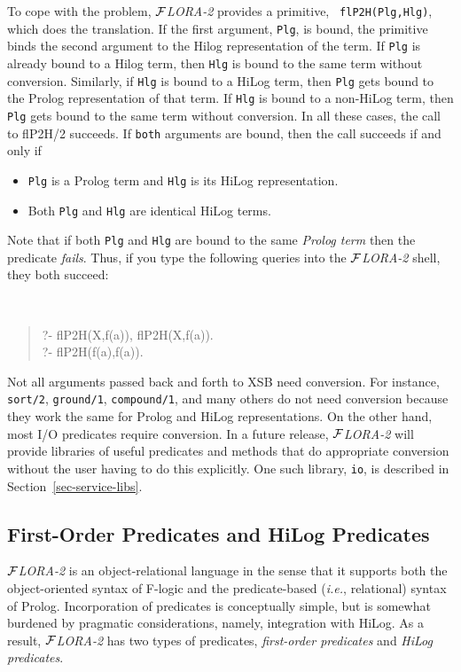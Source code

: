 \documentclass[11pt]{article}
\newcommand{\FLORA}{{\mbox{${\cal F}${\small\it LORA}\rm\emph{-2}}}\xspace}
\newcommand{\fl}{\mbox{F-logic}\xspace}
\begin{document}
To cope with the problem, \FLORA provides a primitive, {\tt
  flP2H(Plg,Hlg)}, which does the translation. If the first argument,
{\tt Plg}, is bound, the primitive binds the second argument to the
Hilog representation of the term. If {\tt Plg} is already bound to a
Hilog term, then {\tt Hlg} is bound to the same term without conversion.
Similarly, if {\tt Hlg} is bound to a HiLog term, then {\tt Plg} gets
bound to the Prolog representation of that term. If {\tt Hlg} is bound to
a non-HiLog term, then {\tt Plg} gets bound to the same term without
conversion. In all these cases, the call to flP2H/2 succeeds. If {\tt both}
arguments are bound, then the call succeeds if and only if
\begin{itemize}
\item {\tt Plg} is a Prolog term and {\tt Hlg} is its HiLog
  representation.
\item Both {\tt Plg} and {\tt Hlg} are identical HiLog terms.
\end{itemize}
Note that if both {\tt Plg} and {\tt Hlg} are bound to the same
\emph{Prolog term} then the predicate \emph{fails}. Thus, if you type the
following queries into the \FLORA shell, they both succeed:
{\tt
\begin{quote}
  ?- flP2H(X,f(a)), flP2H(X,f(a)).  \\
  ?- flP2H(f(a),f(a)).
\end{quote}
}


Not all arguments passed back and forth to XSB need conversion. For
instance, {\tt sort/2}, {\tt ground/1}, {\tt compound/1}, and many others
do not need conversion because they work the same for Prolog and HiLog
representations. On the other hand, most I/O predicates require conversion.
In a future release, \FLORA will provide libraries of useful predicates and
methods that do appropriate conversion without the user having to do
this explicitly. One such library, {\tt io}, is described in
Section~\ref{sec-service-libs}.


\subsection{First-Order Predicates and HiLog Predicates}
\label{sec:flora-modules-predicates}

\FLORA is an object-relational language in the sense that it supports both
the object-oriented syntax of \fl and the predicate-based ({\it i.e.},
relational) syntax of Prolog. Incorporation of predicates is conceptually
simple, but is somewhat burdened by pragmatic considerations, namely,
integration with HiLog. As a result, \FLORA has two types of predicates,
{\em first-order predicates\/} and \emph{HiLog predicates}. 
\end{document}
